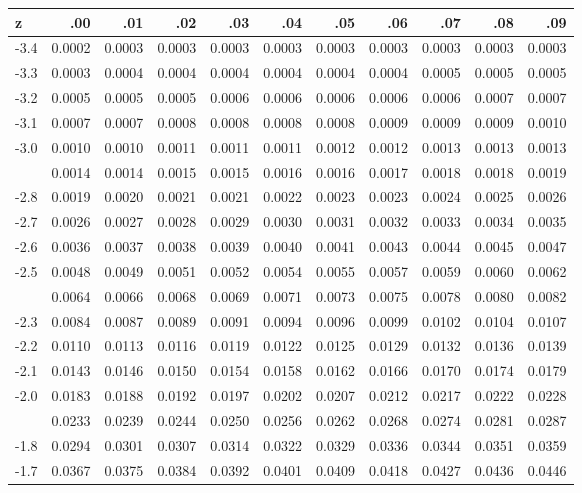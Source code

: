 \documentclass[
]{article}
\begin{document}
\begin{longtable}[t]{lrrrrrrrrrr}
\toprule
z & .00 & .01 & .02 & .03 & .04 & .05 & .06 & .07 & .08 & .09\\
\midrule
-3.4 & 0.0002 & 0.0003 & 0.0003 & 0.0003 & 0.0003 & 0.0003 & 0.0003 & 0.0003 & 0.0003 & 0.0003\\
-3.3 & 0.0003 & 0.0004 & 0.0004 & 0.0004 & 0.0004 & 0.0004 & 0.0004 & 0.0005 & 0.0005 & 0.0005\\
-3.2 & 0.0005 & 0.0005 & 0.0005 & 0.0006 & 0.0006 & 0.0006 & 0.0006 & 0.0006 & 0.0007 & 0.0007\\
-3.1 & 0.0007 & 0.0007 & 0.0008 & 0.0008 & 0.0008 & 0.0008 & 0.0009 & 0.0009 & 0.0009 & 0.0010\\
-3.0 & 0.0010 & 0.0010 & 0.0011 & 0.0011 & 0.0011 & 0.0012 & 0.0012 & 0.0013 & 0.0013 & 0.0013\\
\addlinespace
-2.9 & 0.0014 & 0.0014 & 0.0015 & 0.0015 & 0.0016 & 0.0016 & 0.0017 & 0.0018 & 0.0018 & 0.0019\\
-2.8 & 0.0019 & 0.0020 & 0.0021 & 0.0021 & 0.0022 & 0.0023 & 0.0023 & 0.0024 & 0.0025 & 0.0026\\
-2.7 & 0.0026 & 0.0027 & 0.0028 & 0.0029 & 0.0030 & 0.0031 & 0.0032 & 0.0033 & 0.0034 & 0.0035\\
-2.6 & 0.0036 & 0.0037 & 0.0038 & 0.0039 & 0.0040 & 0.0041 & 0.0043 & 0.0044 & 0.0045 & 0.0047\\
-2.5 & 0.0048 & 0.0049 & 0.0051 & 0.0052 & 0.0054 & 0.0055 & 0.0057 & 0.0059 & 0.0060 & 0.0062\\
\addlinespace
-2.4 & 0.0064 & 0.0066 & 0.0068 & 0.0069 & 0.0071 & 0.0073 & 0.0075 & 0.0078 & 0.0080 & 0.0082\\
-2.3 & 0.0084 & 0.0087 & 0.0089 & 0.0091 & 0.0094 & 0.0096 & 0.0099 & 0.0102 & 0.0104 & 0.0107\\
-2.2 & 0.0110 & 0.0113 & 0.0116 & 0.0119 & 0.0122 & 0.0125 & 0.0129 & 0.0132 & 0.0136 & 0.0139\\
-2.1 & 0.0143 & 0.0146 & 0.0150 & 0.0154 & 0.0158 & 0.0162 & 0.0166 & 0.0170 & 0.0174 & 0.0179\\
-2.0 & 0.0183 & 0.0188 & 0.0192 & 0.0197 & 0.0202 & 0.0207 & 0.0212 & 0.0217 & 0.0222 & 0.0228\\
\addlinespace
-1.9 & 0.0233 & 0.0239 & 0.0244 & 0.0250 & 0.0256 & 0.0262 & 0.0268 & 0.0274 & 0.0281 & 0.0287\\
-1.8 & 0.0294 & 0.0301 & 0.0307 & 0.0314 & 0.0322 & 0.0329 & 0.0336 & 0.0344 & 0.0351 & 0.0359\\
-1.7 & 0.0367 & 0.0375 & 0.0384 & 0.0392 & 0.0401 & 0.0409 & 0.0418 & 0.0427 & 0.0436 & 0.0446\\

\end{longtable}
\end{document}

